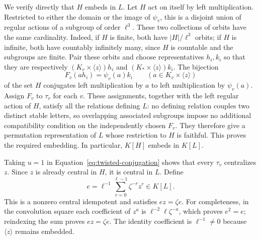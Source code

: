 We verify directly that $H$ embeds in $L$. Let $H$ act on itself by left
multiplication. Restricted to either the domain or the image of
$\psi_v$, this is a disjoint union of regular actions of a subgroup of
order $\ell^3$. These two collections of orbits have the same
cardinality. Indeed, if $H$ is finite, both have $|H|/\ell^3$ orbits;
if $H$ is infinite, both have countably infinitely many, since $H$ is
countable and the subgroups are finite. Pair these orbits and choose
representatives $h_i,k_i$ so that they are respectively
$(K_v\times\langle z\rangle)h_i$ and
$(K_*\times\langle z\rangle)k_i$. The bijection
\[
F_v(ah_i)=\psi_v(a)k_i
\qquad(a\in K_v\times\langle z\rangle)
\]
of the set $H$ conjugates left multiplication by $a$ to left
multiplication by $\psi_v(a)$. Assign $F_v$ to $\tau_v$ for each $v$.
These assignments, together with the left regular action of $H$, satisfy
all the relations defining $L$: no defining relation couples two distinct
stable letters, so overlapping associated subgroups impose no additional
compatibility condition on the independently chosen $F_v$. They therefore give a permutation
representation of $L$ whose restriction to $H$ is faithful. This proves
the required embedding. In particular, $K[H]$ embeds in $K[L]$.

Taking $u=1$ in Equation~\eqref{eq:twisted-conjugation} shows that every
$\tau_v$ centralizes $z$. Since $z$ is already central in $H$, it is
central in $L$. Define
\begin{equation}
\label{eq:central-character-idempotent}
e=\ell^{-1}\sum_{r=0}^{\ell-1}\zeta^{-r}z^r\in K[L].
\end{equation}
This is a nonzero central idempotent and satisfies $ez=\zeta e$.
For completeness, in the convolution square each coefficient of $z^a$
is $\ell^{-2}\ell\zeta^{-a}$, which proves $e^2=e$; reindexing the
sum proves $ez=\zeta e$. The identity coefficient is $\ell^{-1}\ne0$
because $\langle z\rangle$ remains embedded.

